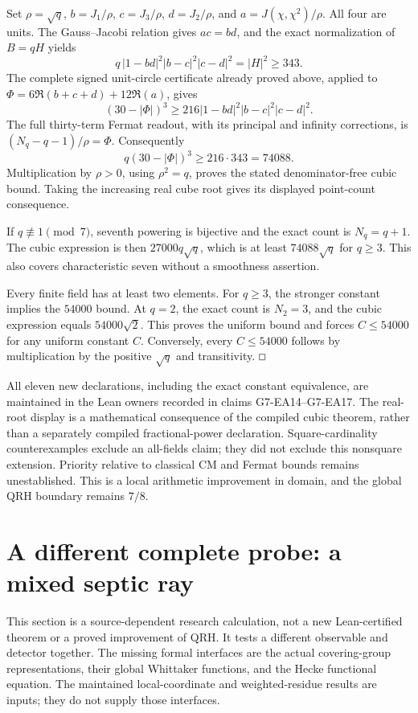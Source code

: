 \documentclass[11pt]{article}
\renewcommand{\square}{\mathord{\vcenter{\hrule\hbox{\vrule height .45em\kern .45em\vrule}\hrule}}}
\begin{document}
Set \(\rho=\sqrt q\), \(b=J_1/\rho\), \(c=J_3/\rho\),
\(d=J_2/\rho\), and \(a=J(\chi,\chi^2)/\rho\).
All four are units. The Gauss--Jacobi relation gives \(ac=bd\),
and the exact normalization of \(B=qH\) yields
\[
 q\,|1-bd|^2|b-c|^2|c-d|^2=|H|^2\ge343.
\]
The complete signed unit-circle certificate already proved above,
applied to
\(\Phi=6\Re(b+c+d)+12\Re(a)\), gives
\[
 (30-|\Phi|)^3
 \ge216|1-bd|^2|b-c|^2|c-d|^2.
\]
The full thirty-term Fermat readout, with its principal and infinity
corrections, is \((N_q-q-1)/\rho=\Phi\). Consequently
\[
 q(30-|\Phi|)^3\ge216\cdot343=74088.
\]
Multiplication by \(\rho>0\), using \(\rho^2=q\), proves the stated
denominator-free cubic bound. Taking the increasing real cube root
gives its displayed point-count consequence.

If \(q\not\equiv1\pmod7\), seventh powering is bijective and the exact
count is \(N_q=q+1\). The cubic expression is then
\(27000q\sqrt q\), which is at least \(74088\sqrt q\) for \(q\ge3\).
This also covers characteristic seven without a smoothness assertion.

Every finite field has at least two elements. For \(q\ge3\), the stronger
constant implies the \(54000\) bound. At \(q=2\), the exact count is
\(N_2=3\), and the cubic expression equals \(54000\sqrt2\).
This proves the uniform bound and forces \(C\le54000\) for any uniform
constant \(C\). Conversely, every \(C\le54000\) follows by multiplication
by the positive \(\sqrt q\) and transitivity. \hfill\(\square\)

All eleven new declarations, including the exact constant equivalence,
are maintained in the Lean owners recorded in claims G7-EA14--G7-EA17.
The real-root display is a mathematical consequence of the compiled
cubic theorem, rather than a separately compiled fractional-power
declaration. Square-cardinality counterexamples exclude an all-fields
claim; they did not exclude this nonsquare extension.
Priority relative to classical CM and Fermat bounds remains
unestablished. This is a local arithmetic improvement in domain, and
the global QRH boundary remains \(7/8\).

\section{A different complete probe: a mixed septic ray}
\label{sec:septic-ray}

This section is a source-dependent research calculation, not a new
Lean-certified theorem or a proved improvement of QRH. It tests a different
observable and detector together. The missing formal interfaces are the
actual covering-group representations, their global Whittaker functions,
and the Hecke functional equation. The maintained local-coordinate and
weighted-residue results are inputs; they do not supply those interfaces.
\end{document}

